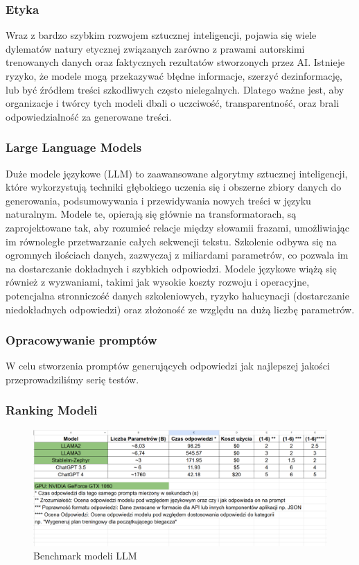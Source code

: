 \subsubsection{Etyka}
Wraz z bardzo szybkim rozwojem sztucznej inteligencji, pojawia się wiele dylematów natury etycznej związanych zarówno z prawami autorskimi trenowanych danych oraz faktycznych rezultatów stworzonych przez AI. Istnieje ryzyko, że modele mogą przekazywać błędne informacje, szerzyć dezinformację, lub być źródłem treści szkodliwych często nielegalnych. Dlatego ważne jest, aby organizacje i twórcy tych modeli dbali o uczciwość, transparentność, oraz brali odpowiedzialność za generowane treści.

\subsubsection{Large Language Models}
Duże modele językowe (LLM) to zaawansowane algorytmy sztucznej inteligencji, które wykorzystują techniki głębokiego uczenia się i obszerne zbiory danych do generowania, podsumowywania i przewidywania nowych treści w języku naturalnym. Modele te, opierają się głównie na transformatorach, są zaprojektowane tak, aby rozumieć relacje między słowami\linebreak i frazami, umożliwiając im równoległe przetwarzanie całych sekwencji tekstu. Szkolenie odbywa się na ogromnych ilościach danych, zazwyczaj z miliardami parametrów, co pozwala im na dostarczanie dokładnych i szybkich odpowiedzi. Modele językowe wiążą się również z wyzwaniami, takimi jak wysokie koszty rozwoju i operacyjne, potencjalna stronniczość danych szkoleniowych, ryzyko halucynacji (dostarczanie niedokładnych odpowiedzi) oraz złożoność ze względu na dużą liczbę parametrów.

\subsubsection{Opracowywanie promptów}
W celu stworzenia promptów generujących odpowiedzi jak najlepszej jakości przeprowadziliśmy serię testów. 


\subsubsection{Ranking Modeli}

\begin{figure}[H]
    \centering
    \includegraphics[width=1\textwidth]{Obrazy/llms_benchmark.png}
    \caption{Benchmark modeli LLM}
    \label{fig:my_label}
\end{figure}

